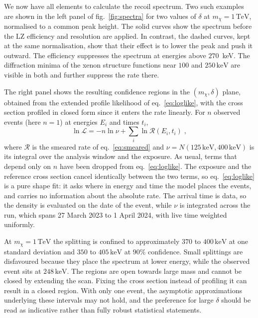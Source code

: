 \documentclass[aps,prl,twocolumn,superscriptaddress,nofootinbib,floatfix]{revtex4-2}
\newcommand{\keV}{\ensuremath{\,\mathrm{keV}}}
\newcommand{\TeV}{\ensuremath{\,\mathrm{TeV}}}
\newcommand{\mchi}{\ensuremath{m_\chi}}
\begin{document}
We now have all elements to calculate the recoil spectrum.  
Two such examples are shown in the left panel of fig.~\ref{fig:spectra} for two values of $\delta$ at $\mchi = 1\TeV$, normalised to a common peak height. 
The solid curves show the spectrum before the LZ efficiency and resolution are applied. 
In contrast, the dashed curves, kept at the same normalisation, show that their effect is to lower the peak and push it outward. 
The efficiency suppresses the spectrum at energies above $270$~keV. 
The diffraction minima of the xenon structure functions near $100$ and $250\keV$ are visible in both and further suppress the rate there.

The right panel shows the resulting confidence regions in the $(\mchi,\delta)$ plane, obtained from the extended profile likelihood of eq.~\eqref{eq:loglike}, with the cross section profiled in closed form since it enters the rate linearly. 
For $n$ observed events (here $n=1$) at energies $E_i$ and times $t_i$,
\begin{equation}
\ln \mathcal{L} = - n \ln \nu + \sum_i \ln \mathcal{R}(E_i, t_i) \;,
\label{eq:loglike}
\end{equation}
where $\mathcal{R}$ is the smeared rate of eq.~\eqref{eq:smeared} and $\nu = N(125\keV,
400\keV)$ is its integral over the analysis window and the exposure. 
As usual, terms that depend only on $n$ have been dropped from eq.~\eqref{eq:loglike}.
The exposure and the
reference cross section cancel identically between the two terms, so
eq.~\eqref{eq:loglike} is a pure shape fit: it asks where in energy and time the model places
the events, and carries no information about the absolute rate.
The arrival time is data, so the density is evaluated on the date of the event, while $\nu$ is integrated across the run,
which spans 27 March 2023 to 1 April 2024, with live time weighted uniformly.

At $\mchi = 1\TeV$ the splitting is confined to approximately $370$ to $400\keV$ at one standard deviation
and $350$ to $405\keV$ at $90\%$ confidence.
Small splittings are disfavoured because they place the spectrum at lower energy, while the observed event sits at $248\keV$. 
The regions are open towards large mass and cannot be closed by extending the scan. 
Fixing the cross section instead of profiling it can result in a closed region. 
With only one event, the asymptotic approximations underlying these intervals may not hold, and the preference for large $\delta$ should be read as indicative rather than fully robust statistical statements.
\end{document}
